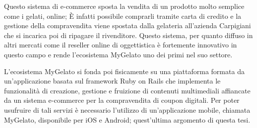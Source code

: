 Questo sistema di e-commerce sposta la vendita di un prodotto molto semplice come i gelati, online; È infatti possibile comprarli tramite carta di credito e la gestione della compravendita viene spostata dalla gelateria all'azienda Carpigiani che si incarica poi di ripagare il rivenditore.
Questo sistema, per quanto diffuso in altri mercati come il reseller online di oggettistica è fortemente innovativo in questo campo e rende l'ecosistema MyGelato uno dei primi nel suo settore.

L'ecosistema MyGelato si fonda poi fisicamente su una piattaforma formata da un’applicazione basata sul framework Ruby on Rails che implementa le funzionalità di creazione, gestione e fruizione di contenuti multimediali affiancate da un sistema e-commerce per la compravendita di coupon digitali.
Per poter usufruire di tali servizi è necessario l'utilizzo di un'applicazione mobile, chiamata MyGelato, disponibile per iOS e Android; quest'ultima argomento di questa tesi.

\newpage
